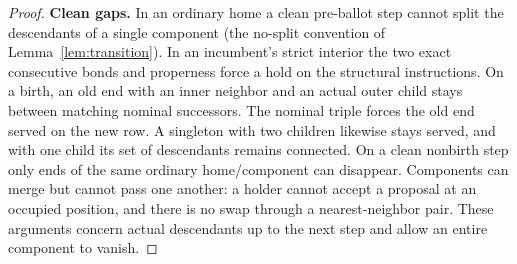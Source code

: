 \begin{proof}
\textbf{Clean gaps.} In an ordinary home a clean pre-ballot step cannot split the descendants of a single component (the no-split convention of Lemma~\ref{lem:transition}). In an incumbent's strict interior the two exact consecutive bonds and properness force a hold on the structural instructions. On a birth, an old end with an inner neighbor and an actual outer child stays between matching nominal successors. The nominal triple forces the old end served on the new row. A singleton with two children likewise stays served, and with one child its set of descendants remains connected. On a clean nonbirth step only ends of the same ordinary home/component can disappear. Components can merge but cannot pass one another: a holder cannot accept a proposal at an occupied position, and there is no swap through a nearest-neighbor pair. These arguments concern actual descendants up to the next step and allow an entire component to vanish.


\end{proof}
